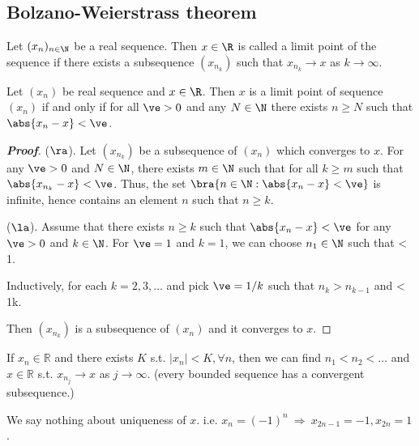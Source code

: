\subsection{Bolzano-Weierstrass theorem}

\begin{definition}
Let $(x_n)_{n\in \N}$ be a real sequence. Then $x\in \R$ is called a limit point of the sequence if there exists a subsequence $(x_{n_k})$ such that $x_{n_k}\to x$ as $k\to \infty$.
\end{definition}

\begin{lemma}\label{lem:limit_point_of_real_sequence_iff}
Let $(x_n)$ be real sequence and $x\in \R$. Then $x$ is a limit point of sequence $(x_n)$ if and only if for all $\ve>0$ and any $N\in\N$ there exists $n\geq N$ such that $\abs{x_n -x} < \ve$.
\end{lemma}

\begin{proof}[\bf Proof]
($\ra$). Let $(x_{n_k})$ be a subsequence of $(x_n)$ which converges to $x$. For any $\ve>0$ and $N\in \N$, there exists $m\in \N$ such that for all $k\geq m$ such that $\abs{x_{n_k} - x} < \ve$. Thus, the set $\bra{n\in \N: \abs{x_n -x}<\ve}$ is infinite, hence contains an element $n$ such that $n\geq k$.

($\la$). Assume that there exists $n\geq k$ such that $\abs{x_n - x}<\ve$ for any $\ve>0$ and $k\in \N$. For $\ve = 1$ and $k=1$, we can choose $n_1\in \N$ such that
\be
{} < 1.
\ee

Inductively, for each $k=2,3,\dots$ and pick $\ve = 1/k$ such that $n_k > n_{k-1}$ and
\be
{} < \frac 1k.
\ee

Then $(x_{n_k})$ is a subsequence of $(x_n)$ and it converges to $x$.%
\end{proof}

\begin{theorem}\label{thm:bolzano_weierstrass_r}
If $x_n\in\mathbb{R}$ and there exists $K$ s.t. $|x_n|<K,\forall n$, then we can find $n_1<n_2<\dots$ and $x\in\mathbb{R}$ s.t. $x_{n_j}\to x$ as $j\to \infty$. (every bounded sequence has a convergent subsequence.)
\end{theorem}

\begin{remark}
We say nothing about uniqueness of $x$. i.e. $x_n=(-1)^n\ \Rightarrow \ x_{2n-1}=-1,x_{2n}=1$.
\end{remark}

